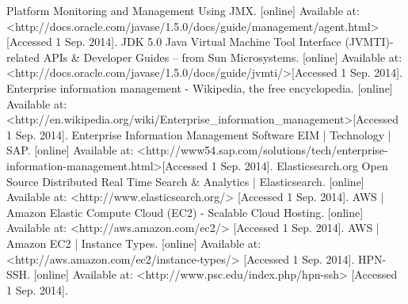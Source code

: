 \documentclass{llncs}
\begin{document}
\begin{thebibliography}{}
 Platform Monitoring and Management Using JMX. [online] Available at: \textless http://docs.oracle.com/javase/1.5.0/docs/guide/management/agent.html\textgreater [Accessed 1 Sep. 2014].
 JDK 5.0 Java Virtual Machine Tool Interface (JVMTI)-related APIs \& Developer Guides -- from Sun Microsystems. [online] Available at: \textless http://docs.oracle.com/javase/1.5.0/docs/guide/jvmti/\textgreater [Accessed 1 Sep. 2014].
 Enterprise information management - Wikipedia, the free encyclopedia. [online] Available at: \textless http://en.wikipedia.org/wiki/Enterprise\_information\_management\textgreater [Accessed 1 Sep. 2014].
 Enterprise Information Management Software EIM | Technology | SAP. [online] Available at: \textless http://www54.sap.com/solutions/tech/enterprise-information-management.html\textgreater [Accessed 1 Sep. 2014].
Elasticsearch.org Open Source Distributed Real Time Search \& Analytics | Elasticsearch. [online] Available at: <http://www.elasticsearch.org/> [Accessed 1 Sep. 2014].
AWS | Amazon Elastic Compute Cloud (EC2) - Scalable Cloud Hosting. [online] Available at: <http://aws.amazon.com/ec2/> [Accessed 1 Sep. 2014].
AWS | Amazon EC2 | Instance Types. [online] Available at: <http://aws.amazon.com/ec2/instance-types/> [Accessed 1 Sep. 2014].
HPN-SSH. [online] Available at: <http://www.psc.edu/index.php/hpn-ssh> [Accessed 1 Sep. 2014].

\end{thebibliography}
%
\end{document}
